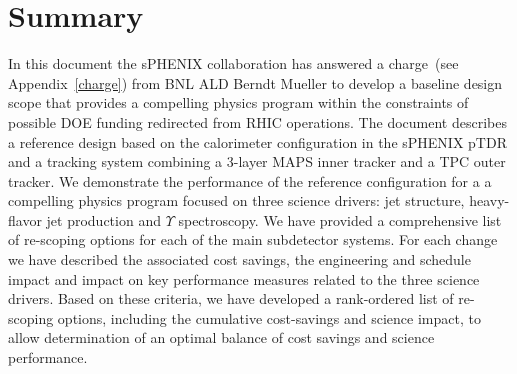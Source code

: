 \section{Summary}

In this document the sPHENIX collaboration has answered a charge~(see
Appendix~\ref{charge}) from BNL ALD Berndt Mueller to develop
a baseline design scope that provides a compelling physics program
within the constraints of possible DOE funding redirected from
RHIC operations. The document describes a reference design based
on the calorimeter configuration in the sPHENIX pTDR and a tracking system
combining a 3-layer MAPS inner tracker and a TPC outer tracker. We
demonstrate the performance of the reference configuration for a
a compelling physics program focused on three science drivers: jet structure,
heavy-flavor jet production and $\Upsilon$ spectroscopy.
We have provided a comprehensive list of re-scoping options for each
of the main subdetector systems. For each change we have 
described the associated
cost savings, the engineering and schedule impact and impact on
key performance measures related to the three science
drivers. Based on these criteria, we have developed a
rank-ordered list of re-scoping options, including the
cumulative cost-savings and science impact, to allow determination
of an optimal balance of cost savings and science performance.
